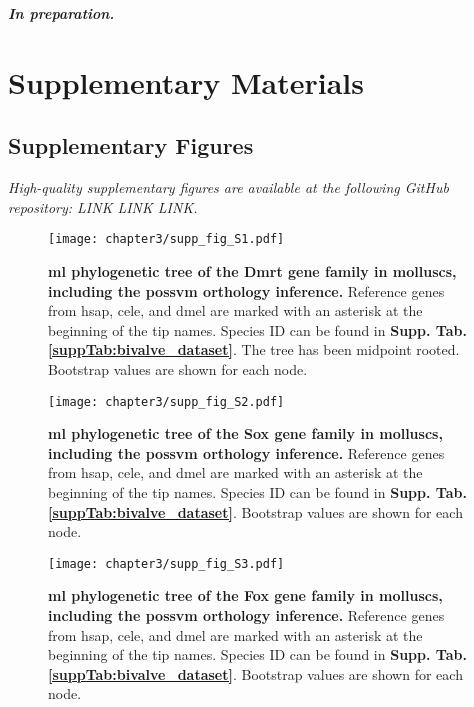 \documentclass[../main.tex]{subfiles}
\begin{document}
\textbf{\textit{In preparation.}}

\clearpage

\section{Supplementary Materials} \label{chapter3_supp}

\subsection{Supplementary Figures}

\textit{High-quality supplementary figures are available at the following GitHub repository: LINK LINK LINK.}

\setcounter{figure}{0}
\renewcommand{\figurename}{Supplementary Figure}
\renewcommand{\thefigure}{S\arabic{chapter}.\arabic{figure}}

\begin{figure}[ht]
	\centering
	\texttt{[image: chapter3/supp\_fig\_S1.pdf]}
	\captionsetup{width=\textwidth}
	\caption{
		\textbf{\gls{ml} phylogenetic tree of the Dmrt gene family in molluscs, including the possvm orthology inference.} Reference genes from \gls{hsap}, \gls{cele}, and \gls{dmel} are marked with an asterisk at the beginning of the tip names. Species ID can be found in \textbf{Supp. Tab. \ref{suppTab:bivalve_dataset}}. The tree has been midpoint rooted. Bootstrap values are shown for each node.
	}
	\label{suppFig:dmrt_bivalves}
\end{figure}

\begin{figure}[ht]
	\centering
	\texttt{[image: chapter3/supp\_fig\_S2.pdf]}
	\captionsetup{width=\textwidth}
	\caption{
		\textbf{\gls{ml} phylogenetic tree of the Sox gene family in molluscs, including the possvm orthology inference.} Reference genes from \gls{hsap}, \gls{cele}, and \gls{dmel} are marked with an asterisk at the beginning of the tip names. Species ID can be found in \textbf{Supp. Tab. \ref{suppTab:bivalve_dataset}}. Bootstrap values are shown for each node.
	}
	\label{suppFig:sox_bivalves}
\end{figure}

\begin{figure}[ht]
	\centering
	\texttt{[image: chapter3/supp\_fig\_S3.pdf]}
	\captionsetup{width=\textwidth}
	\caption{
		\textbf{\gls{ml} phylogenetic tree of the Fox gene family in molluscs, including the possvm orthology inference.} Reference genes from \gls{hsap}, \gls{cele}, and \gls{dmel} are marked with an asterisk at the beginning of the tip names. Species ID can be found in \textbf{Supp. Tab. \ref{suppTab:bivalve_dataset}}. Bootstrap values are shown for each node.
	}
	\label{suppFig:fox_bivalves}
\end{figure}
\end{document}
